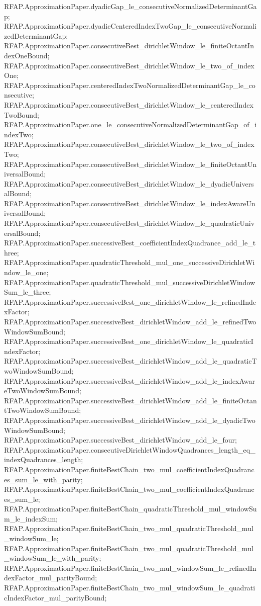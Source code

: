 \documentclass[11pt]{article}
\begin{document}
{RFAP.ApproximationPaper.dyadicGap_le_consecutiveNormalizedDeterminantGap;
RFAP.ApproximationPaper.dyadicCenteredIndexTwoGap_le_consecutiveNormalizedDeterminantGap;
RFAP.ApproximationPaper.consecutiveBest_dirichletWindow_le_finiteOctantIndexOneBound;
RFAP.ApproximationPaper.consecutiveBest_dirichletWindow_le_two_of_indexOne;
RFAP.ApproximationPaper.centeredIndexTwoNormalizedDeterminantGap_le_consecutive;
RFAP.ApproximationPaper.consecutiveBest_dirichletWindow_le_centeredIndexTwoBound;
RFAP.ApproximationPaper.one_le_consecutiveNormalizedDeterminantGap_of_indexTwo;
RFAP.ApproximationPaper.consecutiveBest_dirichletWindow_le_two_of_indexTwo;
RFAP.ApproximationPaper.consecutiveBest_dirichletWindow_le_finiteOctantUniversalBound;
RFAP.ApproximationPaper.consecutiveBest_dirichletWindow_le_dyadicUniversalBound;
RFAP.ApproximationPaper.consecutiveBest_dirichletWindow_le_indexAwareUniversalBound;
RFAP.ApproximationPaper.consecutiveBest_dirichletWindow_le_quadraticUniversalBound;
RFAP.ApproximationPaper.successiveBest_coefficientIndexQuadrance_add_le_three;
RFAP.ApproximationPaper.quadraticThreshold_mul_one_successiveDirichletWindow_le_one;
RFAP.ApproximationPaper.quadraticThreshold_mul_successiveDirichletWindowSum_le_three;
RFAP.ApproximationPaper.successiveBest_one_dirichletWindow_le_refinedIndexFactor;
RFAP.ApproximationPaper.successiveBest_dirichletWindow_add_le_refinedTwoWindowSumBound;
RFAP.ApproximationPaper.successiveBest_one_dirichletWindow_le_quadraticIndexFactor;
RFAP.ApproximationPaper.successiveBest_dirichletWindow_add_le_quadraticTwoWindowSumBound;
RFAP.ApproximationPaper.successiveBest_dirichletWindow_add_le_indexAwareTwoWindowSumBound;
RFAP.ApproximationPaper.successiveBest_dirichletWindow_add_le_finiteOctantTwoWindowSumBound;
RFAP.ApproximationPaper.successiveBest_dirichletWindow_add_le_dyadicTwoWindowSumBound;
RFAP.ApproximationPaper.successiveBest_dirichletWindow_add_le_four;
RFAP.ApproximationPaper.consecutiveDirichletWindowQuadrances_length_eq_indexQuadrances_length;
RFAP.ApproximationPaper.finiteBestChain_two_mul_coefficientIndexQuadrances_sum_le_with_parity;
RFAP.ApproximationPaper.finiteBestChain_two_mul_coefficientIndexQuadrances_sum_le;
RFAP.ApproximationPaper.finiteBestChain_quadraticThreshold_mul_windowSum_le_indexSum;
RFAP.ApproximationPaper.finiteBestChain_two_mul_quadraticThreshold_mul_windowSum_le;
RFAP.ApproximationPaper.finiteBestChain_two_mul_quadraticThreshold_mul_windowSum_le_with_parity;
RFAP.ApproximationPaper.finiteBestChain_two_mul_windowSum_le_refinedIndexFactor_mul_parityBound;
RFAP.ApproximationPaper.finiteBestChain_two_mul_windowSum_le_quadraticIndexFactor_mul_parityBound;
}
\end{document}
